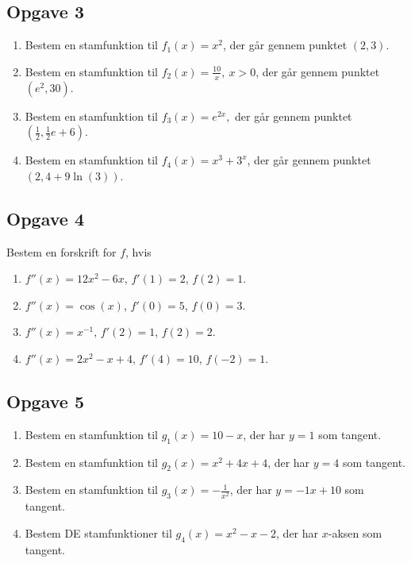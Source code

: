 \subsection*{Opgave 3}
\begin{enumerate}[label=\roman*)]
	\item Bestem en stamfunktion til $f_1(x)=x^2$, der går gennem punktet $(2,3)$. 
	\item Bestem en stamfunktion til $f_2(x) = \frac{10}{x}, \ x>0$, der går gennem punktet $(e^2,30)$.
	\item Bestem en stamfunktion til $f_3(x) = e^{2x},$ der går gennem punktet $(\frac{1}{2},\frac{1}{2}e+6)$.
	\item Bestem en stamfunktion til $f_4(x) = x^3 + 3^x$, der går gennem punktet \\ $(2,4+9\ln(3))$.
\end{enumerate}

\subsection*{Opgave 4}
Bestem en forskrift for $f$, hvis 
\begin{enumerate}[label=\roman*)]
	\item $f''(x) = 12x^2 - 6x$, $f'(1) = 2$, $f(2) = 1$.
	\item $f''(x) = \cos(x)$, $f'(0) = 5$, $f(0) = 3$.
	\item $f''(x) = x^{-1}$, $f'(2) = 1$, $f(2) = 2$.
	\item $f''(x) = 2x^2-x+4$, $f'(4) = 10$, $f(-2) = 1$.
\end{enumerate}
\subsection*{Opgave 5}
\begin{enumerate}[label=\roman*)]
\item Bestem en stamfunktion til $g_1(x) = 10-x$, der har $y=1$ som tangent.
\item Bestem en stamfunktion til $g_2(x) = x^2+4x+4$, der har  $y=4$ som tangent.
\item Bestem en stamfunktion til $g_3(x) = -\frac{1}{x^2}$, der har $y = -1x+10$ som tangent.
\item Bestem DE stamfunktioner til $g_4(x) = x^2-x-2$, der har $x$-aksen som tangent.
\end{enumerate}